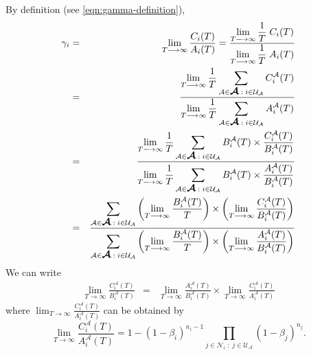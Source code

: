 \documentclass[10pt,a4paper,journal]{IEEEtran}
\theoremstyle{definition}
\theoremstyle{remark}
\theoremstyle{plain}
\newcommand{\bmath}[1]{\mbox{\boldmath$#1$}}
\begin{document}
By definition (see \eqref{eqn:gamma-definition}), 
\begin{eqnarray}
\label{eqn:gamma_i-multicell-derivation}
\gamma_i &=& \displaystyle \lim_{T \longrightarrow \infty} \frac{C_i(T)}{A_i(T)} = \displaystyle \frac{\displaystyle \lim_{T \longrightarrow \infty} \frac{1}{T} \; C_i(T)}{\displaystyle \lim_{T \longrightarrow \infty} \frac{1}{T} \; A_i(T)} \nonumber \\ 
&=& \frac{\displaystyle \lim_{T \longrightarrow \infty} \frac{1}{T} \sum_{\mathcal{A} \in \bmath{\mathcal{A}} \; : \; i \in \mathcal{U}_{\mathcal{A}}} C_i^{\mathcal{A}}(T)}{\displaystyle \lim_{T \longrightarrow \infty} \frac{1}{T} \sum_{\mathcal{A} \in \bmath{\mathcal{A}} \; : \; i \in \mathcal{U}_{\mathcal{A}}} A_i^{\mathcal{A}}(T)} \nonumber \\
&=& \frac{\displaystyle \lim_{T \longrightarrow \infty} \frac{1}{T} \sum_{\mathcal{A} \in \bmath{\mathcal{A}} \; : \; i \in \mathcal{U}_{\mathcal{A}}} B_i^{\mathcal{A}}(T) \times \frac{C_i^{\mathcal{A}}(T)}{B_i^{\mathcal{A}}(T)}}{\displaystyle \lim_{T \longrightarrow \infty} \frac{1}{T} \sum_{\mathcal{A} \in \bmath{\mathcal{A}} \; : \; i \in \mathcal{U}_{\mathcal{A}}} B_i^{\mathcal{A}}(T) \times \frac{A_i^{\mathcal{A}}(T)}{B_i^{\mathcal{A}}(T)}} \nonumber \\ 
&=& \frac{\displaystyle \sum_{\mathcal{A} \in \bmath{\mathcal{A}} \; : \; i \in \mathcal{U}_{\mathcal{A}}} \left(\lim_{T \longrightarrow \infty} \frac{B_i^{\mathcal{A}}(T)}{T}\right) \times \left(\lim_{T \longrightarrow \infty}\frac{C_i^{\mathcal{A}}(T)}{B_i^{\mathcal{A}}(T)}\right)}{\displaystyle \sum_{\mathcal{A} \in \bmath{\mathcal{A}} \; : \; i \in \mathcal{U}_{\mathcal{A}}} \left(\lim_{T \longrightarrow \infty} \frac{B_i^{\mathcal{A}}(T)}{T}\right) \times \left(\lim_{T \longrightarrow \infty} \frac{A_i^{\mathcal{A}}(T)}{B_i^{\mathcal{A}}(T)}\right)} \nonumber \\ 
\end{eqnarray}
We can write 
\begin{eqnarray}
\label{eqn:product-of-limits}
\lim_{T \longrightarrow \infty}\frac{C_i^{\mathcal{A}}(T)}{B_i^{\mathcal{A}}(T)} &=& \lim_{T \longrightarrow \infty} \frac{A_i^{\mathcal{A}}(T)}{B_i^{\mathcal{A}}(T)} \times \lim_{T \longrightarrow \infty}\frac{C_i^{\mathcal{A}}(T)}{A_i^{\mathcal{A}}(T)}
\end{eqnarray}
where $\lim_{T \longrightarrow \infty}\frac{C_i^{\mathcal{A}}(T)}{A_i^{\mathcal{A}}(T)}$ can be obtained by 
\begin{equation}
\label{eqn:collision-probability-in-state-A}
\displaystyle \lim_{T \longrightarrow \infty} \frac{C_i^{\mathcal{A}}(T)}{A_i^{\mathcal{A}}(T)} = 1 - (1-\beta_i)^{n_i-1} \prod_{j \in \mathcal{N}_i \; : \; j \in \mathcal{U}_{\mathcal{A}}} (1-\beta_j)^{n_j}. 
\end{equation}
\end{document}
